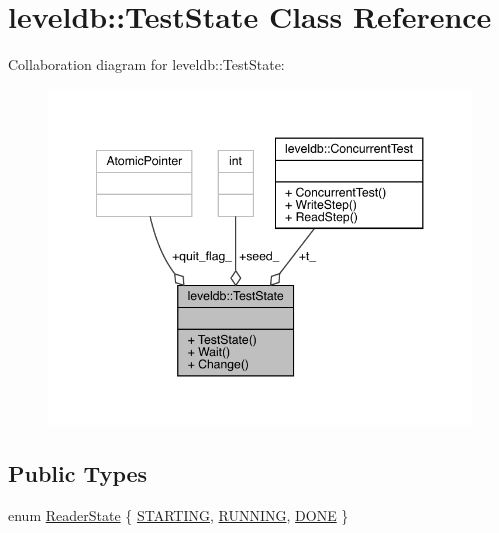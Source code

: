 \hypertarget{classleveldb_1_1_test_state}{}\section{leveldb\+::Test\+State Class Reference}
\label{classleveldb_1_1_test_state}


Collaboration diagram for leveldb\+::Test\+State\+:
\nopagebreak
\begin{figure}[H]
\begin{center}
\leavevmode
\includegraphics[width=348pt]{classleveldb_1_1_test_state__coll__graph}
\end{center}
\end{figure}
\subsection*{Public Types}
\begin{DoxyCompactItemize}
\item 
enum \mbox{\hyperlink{classleveldb_1_1_test_state_a1bf1f0a16815237ff1f29d2925d9a4ad}{Reader\+State}} \{ \mbox{\hyperlink{classleveldb_1_1_test_state_a1bf1f0a16815237ff1f29d2925d9a4ada93ff507fceeb18ff487d343ce24e49fb}{S\+T\+A\+R\+T\+I\+NG}}, 
\mbox{\hyperlink{classleveldb_1_1_test_state_a1bf1f0a16815237ff1f29d2925d9a4adab21481f14b9bab70778076d33ea574da}{R\+U\+N\+N\+I\+NG}}, 
\mbox{\hyperlink{classleveldb_1_1_test_state_a1bf1f0a16815237ff1f29d2925d9a4ada5d7f032453f326a46f7ebd8b3f0c7d83}{D\+O\+NE}}
 \}
\end{DoxyCompactItemize}
